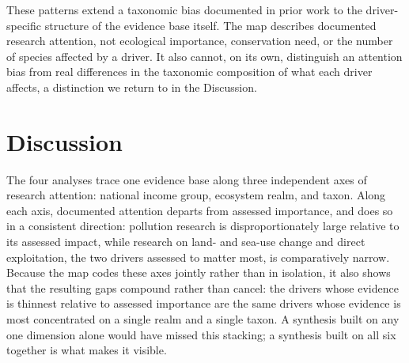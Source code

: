 \documentclass[12pt]{article}
\begin{document}
These patterns extend a taxonomic bias documented in prior work \cite{titley_scientific_2017, troudet2017taxonomic} to the driver-specific structure of the evidence base itself. The map describes documented research attention, not ecological importance, conservation need, or the number of species affected by a driver. It also cannot, on its own, distinguish an attention bias from real differences in the taxonomic composition of what each driver affects, a distinction we return to in the Discussion.




\newpage
\section*{Discussion}
\label{sec:discussion}

The four analyses trace one evidence base along three independent axes of research attention: national income group, ecosystem realm, and taxon. Along each axis, documented attention departs from assessed importance, and does so in a consistent direction: pollution research is disproportionately large relative to its assessed impact, while research on land- and sea-use change and direct exploitation, the two drivers assessed to matter most, is comparatively narrow. Because the map codes these axes jointly rather than in isolation, it also shows that the resulting gaps compound rather than cancel: the drivers whose evidence is thinnest relative to assessed importance are the same drivers whose evidence is most concentrated on a single realm and a single taxon. A synthesis built on any one dimension alone would have missed this stacking; a synthesis built on all six together is what makes it visible.
\end{document}
